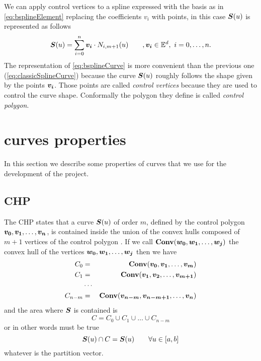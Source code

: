 \documentclass[dissertation.tex]{subfiles}
\begin{document}
We can apply control vertices to a spline expressed with the \bs
basis as in \cref{eq:bsplineElement} replacing the coefficients $v_i$
with points, in this case $\boldsymbol{S}(u)$ is represented as follows
\begin{equation}\label{eq:bsplineCurve}
  \boldsymbol{S}(u)=\sum_{i=0}^n\boldsymbol{v_i}\cdot N_{i,m+1}(u)\qquad
  ,\boldsymbol{v_i}\in\mathbb{E}^d,\ i=0,\dots,n.
\end{equation}
The representation of \cref{eq:bsplineCurve} is more convenient
than the previous one (\cref{eq:classicSplineCurve}) because the curve
$\boldsymbol{S}(u)$ roughly 
follows the shape given by the points $\boldsymbol{v_i}$. Those points are
called \emph{control vertices} because they are used to control the
curve shape. Conformally the polygon they define is called \emph{control polygon}.

\section{\bss curves properties}\label{sec:bsplineProp}
In this section we describe some properties of \bs curves that we
use for the development of the project.

\subsection{\acf{CHP}}\label{sec:convexHull}
The \acf{CHP} states that a \bs curve $\boldsymbol{S}(u)$ of order $m$,
defined by the control polygon 
$\boldsymbol{v_0},\boldsymbol{v_1},\dots,\boldsymbol{v_n}$, is contained inside the union of the
convex hulls composed of $m+1$ vertices of the control polygon
\cite{farin}. If we
call $\mathbf{Conv}(\boldsymbol{w_0},\boldsymbol{w_1},\dots,\boldsymbol{w_j})$ the convex hull of the
vertices $\boldsymbol{w_0},\boldsymbol{w_1},\dots,\boldsymbol{w_j}$ then we have
\begin{eqnarray*}
  C_0&=&\mathbf{Conv}(\boldsymbol{v_0},\boldsymbol{v_1},\dots,\boldsymbol{v_{m}})\\
  C_1&=&\mathbf{Conv}(\boldsymbol{v_1},\boldsymbol{v_2},\dots,\boldsymbol{v_{m+1}})\\
  &\cdots&\\
  C_{n-m}&=&\mathbf{Conv}(\boldsymbol{v_{n-m}},\boldsymbol{v_{n-m+1}},\dots,\boldsymbol{v_{n}})\\
\end{eqnarray*}
and the area where $\boldsymbol{S}$ is contained is
\begin{equation*}
  C=C_0\cup C_1\cup\dots\cup C_{n-m}
\end{equation*}
or in other words must be true
\begin{equation*}
  \boldsymbol{S}(u)\cap C =\boldsymbol{S}(u)\qquad \forall u\in[a,b]
\end{equation*}
whatever is the partition vector.
\end{document}
